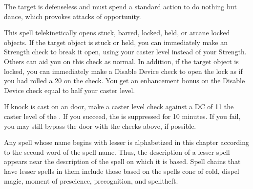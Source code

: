 \begin{spellheader}
    \spellrng{\rngclose}
\end{spellheader}
\begin{spelleffects}
    \spelleffect The target is defenseless and must spend a standard action to do nothing but dance, which provokes attacks of opportunity.
\end{spelleffects}
\begin{spellfooter}

\end{spellfooter}

\begin{comment}
\subsubsection{J-L}
\end{comment}

\begin{spellheader}
    \spellrng{\rngclose}
\end{spellheader}
\begin{spelleffects}
    \spelleffect This spell telekinetically opens stuck, barred, locked, held, or arcane locked objects. If the target object is stuck or held, you can immediately make an Strength check to break it open, using your caster level instead of your Strength. Others can aid you on this check as normal. In addition, if the target object is locked, you can immediately make a Disable Device check to open the lock as if you had rolled a 20 on the check. You get an enhancement bonus on the Disable Device check equal to half your caster level.
\end{spelleffects}
\begin{spellfooter}
    \spellnotes If knock is cast on an  door, make a caster level check against a DC of 11 \add the caster level of the . If you succeed, the  is suppressed for 10 minutes. If you fail, you may still bypass the door with the checks above, if possible.

    \par Any spell whose name begins with lesser is alphabetized in this chapter according to the second word of the spell name. Thus, the description of a lesser spell appears near the description of the spell on which it is based. Spell chains that have lesser spells in them include those based on the spells cone of cold, dispel magic, moment of prescience, precognition, and spelltheft.
\end{spellfooter}

